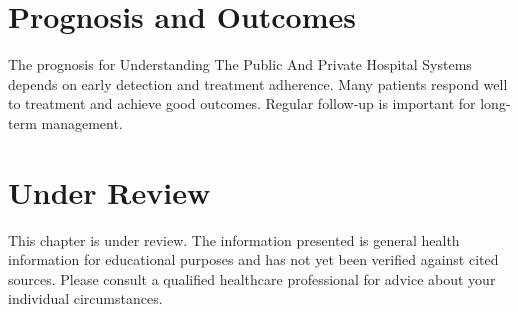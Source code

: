\section*{Prognosis and Outcomes}
The prognosis for Understanding The Public And Private Hospital Systems depends on early detection and treatment adherence. Many patients respond well to treatment and achieve good outcomes. Regular follow-up is important for long-term management.
\section*{Under Review}
This chapter is under review. The information presented is general health information for educational purposes and has not yet been verified against cited sources. Please consult a qualified healthcare professional for advice about your individual circumstances.


\clearpage
